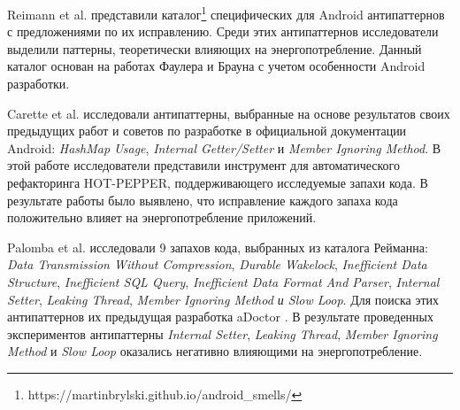 Reimann et al. \cite{reimann2014tool} представили каталог\footnote{https://martinbrylski.github.io/android\_smells/} специфических для Android антипаттернов с предложениями по их исправлению. Среди этих антипаттернов исследователи выделили паттерны, теоретически влияющих на энергопотребление. Данный каталог основан на работах Фаулера и Брауна с учетом особенности Android разработки. 

Carette et al. \cite{carette2017investigating} исследовали антипаттерны, выбранные на основе результатов своих предыдущих работ и советов по разработке в официальной документации Android: \emph{HashMap Usage}, \emph{Internal Getter/Setter} и \emph{Member Ignoring Method}. В этой работе исследователи представили инструмент для автоматического рефакторинга HOT-PEPPER, поддерживающего исследуемые запахи кода. В результате работы было выявлено, что исправление каждого запаха кода положительно влияет на энергопотребление приложений.

Palomba et al. \cite{palomba2019impact} исследовали 9 запахов кода, выбранных из каталога Рейманна: \emph{Data Transmission Without Compression}, \emph{Durable Wakelock}, \emph{Inefficient Data Structure}, \emph{Inefficient SQL Query}, \emph{Inefficient Data Format And Parser}, \emph{Internal Setter}, \emph{Leaking Thread}, \emph{Member Ignoring Method и Slow Loop}. Для поиска этих антипаттернов их предыдущая разработка aDoctor \cite{palomba2017lightweight}. В результате проведенных экспериментов антипаттерны \emph{Internal Setter}, \emph{Leaking Thread}, \emph{Member Ignoring Method} и \emph{Slow Loop} оказались негативно влияющими на энергопотребление.

